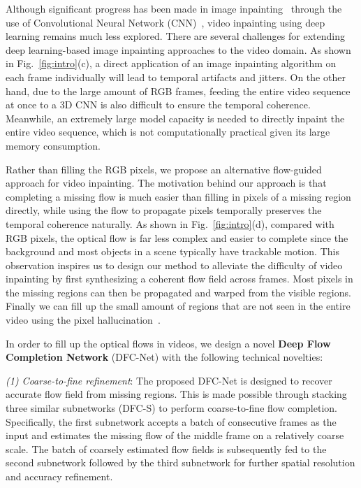 \documentclass[10pt,twocolumn,letterpaper]{article}
\begin{document}
Although significant progress has been made in image inpainting~\cite{iizuka2017globally, kohler2014mask, pathak2016context, ren2015shepard, yu2018generative} through the use of Convolutional Neural Network (CNN)~\cite{krizhevsky2012imagenet}, video inpainting using deep learning remains much less explored.
There are several challenges for extending deep learning-based image inpainting approaches to the video domain.
As shown in Fig.~\ref{fig:intro}(c), a direct application of an image inpainting algorithm on each frame individually will lead to temporal artifacts and jitters.
On the other hand, due to the large amount of RGB frames, feeding the entire video sequence at once to a 3D CNN is also difficult to ensure the temporal coherence.
Meanwhile, an extremely large model capacity is needed to directly inpaint the entire video sequence, which is not computationally practical given its large memory consumption.




Rather than filling the RGB pixels, we propose an alternative flow-guided approach for video inpainting.
The motivation behind our approach is that completing a missing flow is much easier than filling in pixels of a missing region directly, while using the flow to propagate pixels temporally preserves the temporal coherence naturally.
As shown in Fig.~\ref{fig:intro}(d), compared with RGB pixels, the optical flow is far less complex and easier to complete since the background and most objects in a scene typically have trackable motion.
This observation inspires us to design our method to alleviate the difficulty of video inpainting by first synthesizing a coherent flow field across frames. 
Most pixels in the missing regions can then be propagated and warped from the visible regions. Finally we can fill up the small amount of regions that are not seen in the entire video using the pixel hallucination~\cite{yu2018generative}. 







In order to fill up the optical flows in videos, we design a  novel \textbf{Deep Flow Completion Network} (DFC-Net) with the following technical novelties:

\noindent \textit{(1) Coarse-to-fine refinement}:
The proposed DFC-Net is designed to recover accurate flow field from missing regions.
This is made possible through stacking three similar subnetworks (DFC-S) to perform coarse-to-fine flow completion.
Specifically, the first subnetwork accepts a batch of consecutive frames as the input and estimates the missing flow of the middle frame on a relatively coarse scale.
The batch of coarsely estimated flow fields is subsequently fed to the second subnetwork followed by the third subnetwork for further spatial resolution and accuracy refinement.
\end{document}
